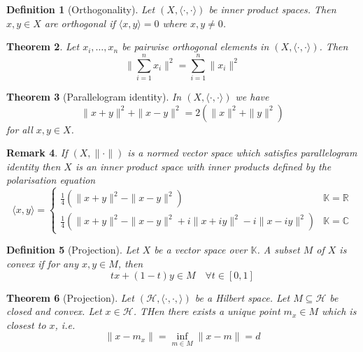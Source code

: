 \documentclass[12pt, oneside, a4paper]{article}
\newtheorem{thm}{Theorem}[section]
\theoremstyle{dfn}
\newtheorem{dfn}[thm]{Definition}
\newtheorem{rem}[thm]{Remark}
\newcommand{\R}{\mathbb{R}}
\newcommand{\K}{\mathbb{K}}
\newcommand{\Hil}{\mathcal{H}}
\newcommand{\Com}{\mathbb{C}}
\begin{document}
\begin{dfn}[Orthogonality]
    Let $(X, \langle \cdot , \cdot \rangle )$ be inner product spaces.  Then $x, y \in X $ are orthogonal if $\langle x, y \rangle = 0$ where $x, y \neq 0$.  
\end{dfn}

\begin{thm}
    Let $x_i, \dots, x_n$ be pairwise orthogonal elements in $(X, \langle \cdot , \cdot \rangle)$.  Then \[
        \| \sum_{i=1}^n x_i \|^2 = \sum_{i=1}^n \|x_i\|^2
    \]
\end{thm}

\begin{thm}[Parallelogram identity]
    In $(X, \langle \cdot, \cdot \rangle)$ we have \[
         \| x+ y \|^2 + \| x-y \|^2 = 2( \| x \|^2 + \|y \|^2) \tag{$\star$}
    \] for all $x, y \in X$.
\end{thm}

\begin{rem}
    If $(X, \| \cdot \|)$ is a normed vector space which satisfies parallelogram identity then $X$ is an inner product space with inner products defined by the polarisation equation \[
    \langle x, y \rangle =  \begin{cases} 
            \frac{1}{4} \left( \| x + y \|^2 - \| x - y \|^2 \right)    & \K = \R \\
            \frac{1}{4}\left( \| x + y\|^2 - \| x - y \|^2 + i\| x + iy \|^2 - i\|x - iy\|^2 \right)                                                & \K = \Com
        \end{cases}
    \]
\end{rem}

\begin{dfn}[Projection]
    Let $X$ be a vector space over $\K$.  A subset $M$ of $X$ is convex if for any $x, y \in M$, then \[
        tx + (1-t) y \in M \quad \forall t \in [0,1]
    \]
\end{dfn}

\begin{thm}[Projection]
    Let $(\Hil, \langle \cdot, \cdot, \rangle )$ be a Hilbert space.  Let $M \subseteq \Hil$ be closed and convex.  Let $x \in \Hil$.  THen there exists a unique point $m_x \in M$ which is closest to $x$, i.e. \[
        \| x - m_x \| = \inf_{m \in M} \| x - m \| = d
    \]  
\end{thm}
\end{document}
